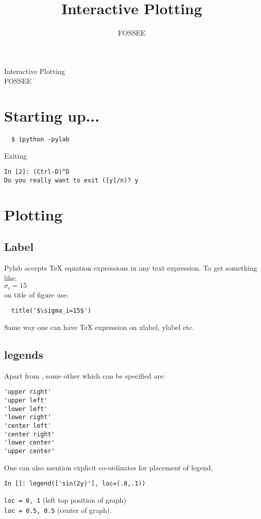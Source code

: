 \documentclass[12pt]{article}
\title{Interactive Plotting}
\author{FOSSEE}
\newcommand{\typ}[1]{\lstinline{#1}}
\begin{document}
\date{}
\vspace{-1in}
\begin{center}
\LARGE{Interactive Plotting}\\
\large{FOSSEE}
\end{center}
\section{Starting up...}

\begin{lstlisting}
  $ ipython -pylab  
\end{lstlisting}
Exiting 
\begin{lstlisting}     
In [2]: (Ctrl-D)^D
Do you really want to exit ([y]/n)? y
\end{lstlisting} %

\section{Plotting}

\subsection{Label}
Pylab accepts TeX equation expressions in any text expression. To get something like:\\
$\sigma_i=15$ \\
on title of figure use: 
\begin{lstlisting}
  title('$\sigma_i=15$')
\end{lstlisting}  
Same way one can have TeX expression on xlabel, ylabel etc.

\subsection{legends}
Apart from , some other  which can be specified are:
\begin{lstlisting}
'upper right'
'upper left'      
'lower left'      
'lower right'     
'center left'     
'center right'    
'lower center'    
'upper center'    
\end{lstlisting}
\newpage
One can also mention explicit co-ordinates for placement of legend. 
\begin{lstlisting}
In []: legend(['sin(2y)'], loc=(.8,.1)) 
\end{lstlisting}
\typ{loc = 0, 1} (left top position of graph)\\
\typ{loc = 0.5, 0.5} (center of graph).
\end{document}
